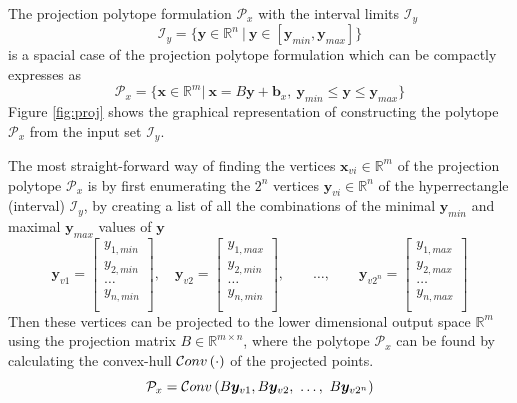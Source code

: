 The projection polytope formulation $\mathcal{P}_x$ with the interval limits $\mathcal{I}_y$
\begin{equation}
    \mathcal{I}_y = \{ \bm{y}\in\mathbb{R}^n ~|~ \bm{y}\in[\bm{y}_{min},\bm{y}_{max}]\}
\end{equation}
is a spacial case of the projection polytope formulation which can be compactly expresses as
\begin{equation}
    \mathcal{P}_x=\{\bm{x}\in\mathbb{R}^m |~ \bm{x} = B\bm{y} + \bm{b}_x,~\bm{y}_{min} \leq  \bm{y} \leq \bm{y}_{max}  \}
    \label{eq:proj_hyp}
\end{equation}
Figure \ref{fig:proj} shows the graphical representation of constructing the polytope $\mathcal{P}_x$ from the input set $\mathcal{I}_y$.

The most straight-forward way of finding the vertices $\bm{x}_{vi}\in\mathbb{R}^m$ of the projection polytope $\mathcal{P}_x$ is by first enumerating the $2^n$ vertices $\bm{y}_{vi}\in\mathbb{R}^n$ of the hyperrectangle  (interval) $\mathcal{I}_y$, by creating a list of all the combinations of the minimal $\bm{y}_{min}$ and maximal $\bm{y}_{max}$ values of $\bm{y}$
\begin{equation}
    \bm{y}_{v1} = \begin{bmatrix}
        y_{1,min}\\
        y_{2,min}\\
        \ldots\\
        y_{n,min}\\
    \end{bmatrix},\quad
    \bm{y}_{v2} = \begin{bmatrix}
        y_{1,max}\\
        y_{2,min}\\
        \ldots\\
        y_{n,min}\\
    \end{bmatrix},\qquad\ldots,\qquad
    \bm{y}_{v2^n} = \begin{bmatrix}
        y_{1,max}\\
        y_{2,max}\\
        \ldots\\
        y_{n,max}\\
    \end{bmatrix} 
\end{equation}
Then these vertices can be projected to the lower dimensional output space $\mathbb{R}^m$ using the projection matrix $B\in \mathbb{R}^{m\times n}$, where the polytope $\mathcal{P}_x$ can be found by calculating the convex-hull $\mathcal{C}onv\left(\cdot\right)$ of the projected points.
\begin{equation}
    \mathcal{P}_x = \mathcal{C}onv\left(B\bm{y}_{v1},B\bm{y}_{v2},~\ldots, ~ B\bm{y}_{v2^n}\right)
\end{equation}

